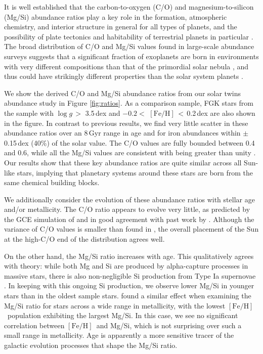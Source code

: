 \documentclass[twocolumn]{aastex62}
\newcommand{\logg}{$\log g$}
\newcommand{\feh}{$\mathrm{[Fe/H]}$}
\begin{document}
It is well established that the carbon-to-oxygen (C/O) and magnesium-to-silicon (Mg/Si) abundance ratios play a key role in the formation, atmospheric chemistry, and interior structure in general for all types of planets, and the possibility of plate tectonics and habitability of terrestrial planets in particular \citep{kuchner05, madhu11, oberg11, unterborn14, unterborn17a}.
The broad distribution of C/O and Mg/Si values found in large-scale abundance surveys suggests that a significant fraction of exoplanets are born in environments with very different compositions than that of the primordial solar nebula \citep{delgado10, petigura11, adibekyan12, bensby14, brewer16}, and thus could have strikingly different properties than the solar system planets \citep{bond10, carter-bond12, unterborn17b}. 

We show the derived C/O and Mg/Si abundance ratios from our solar twins abundance study in Figure \ref{fig:ratios}. 
As a comparison sample, FGK stars from the \citet{brewer16} sample with \logg\,$>$ 3.5\,dex and $-0.2 <$ \feh\,$<$\,0.2\,dex are also shown in the figure.
In contrast to previous results, we find very little scatter in these abundance ratios over an 8\,Gyr range in age and for iron abundances within $\pm$0.15\,dex (40\%) of the solar value. 
The C/O values are fully bounded between 0.4 and 0.6, while all the Mg/Si values are consistent with being greater than unity \citep[compare to the solar values of 0.54 and 1.05, respectively][]{asplund09}.
Our results show that these key abundance ratios are quite similar across all Sun-like stars, implying that planetary systems around these stars are born from the same chemical building blocks.

We additionally consider the evolution of these abundance ratios with stellar age and/or metallicity. The C/O ratio appears to evolve very little, as predicted by the GCE simulation of \citet{gaidos15} and in good agreement with past work by \citet{nissen15}. Although the variance of C/O values is smaller than found in \citet{brewer16}, the overall placement of the Sun at the high-C/O end of the distribution agrees well.

On the other hand, the Mg/Si ratio increases with age. This qualitatively agrees with theory: while both Mg and Si are produced by alpha-capture processes in massive stars, there is also non-negligible Si production from Type Ia supernovae \citep[e.g.][]{Burbidge1957}. In keeping with this ongoing Si production, we observe lower Mg/Si in younger stars than in the oldest sample stars. \citet{Adibekyan2015a} found a similar effect when examining the Mg/Si ratio for stars across a wide range in metallicity, with the lowest \feh\ population exhibiting the largest Mg/Si. In this case, we see no significant correlation between \feh\ and Mg/Si, which is not surprising over such a small range in metallicity. Age is apparently a more sensitive tracer of the galactic evolution processes that shape the Mg/Si ratio.
\end{document}

